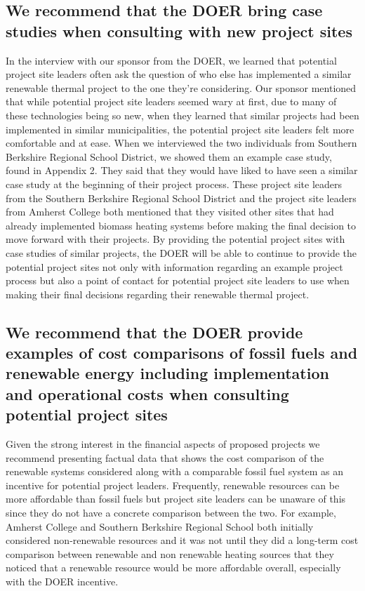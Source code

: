 \subsection{We recommend that the DOER bring case studies when consulting with new project sites}
\par In the interview with our sponsor from the DOER, we learned that potential project site leaders often ask the question of who else has implemented a similar renewable thermal project to the one they're considering. Our sponsor mentioned that while potential project site leaders seemed wary at first, due to many of these technologies being so new, when they learned that similar projects had been implemented in similar municipalities, the potential project site leaders felt more comfortable and at ease. When we interviewed the two individuals from Southern Berkshire Regional School District, we showed them an example case study, found in Appendix 2. They said that they would have liked to have seen a similar case study at the beginning of their project process. These project site leaders from the Southern Berkshire Regional School District and the project site leaders from Amherst College both mentioned that they visited other sites that had already implemented biomass heating systems before making the final decision to move forward with their projects. By providing the potential project sites with case studies of similar projects, the DOER will be able to continue to provide the potential project sites not only with information regarding an example project process but also a point of contact for potential project site leaders to use when making their final decisions regarding their renewable thermal project.

\subsection{We recommend that the DOER provide examples of cost comparisons of fossil fuels and renewable energy including implementation and operational costs when consulting potential project sites}
\par Given the strong interest in the financial aspects of proposed projects we recommend presenting factual data that shows the cost comparison of the renewable systems considered along with a comparable fossil fuel system as an incentive for potential project leaders. Frequently, renewable resources can be more affordable than fossil fuels but project site leaders can be unaware of this since they do not have a concrete comparison between the two. For example, Amherst College and Southern Berkshire Regional School both initially considered non-renewable resources and it was not until they did a long-term cost comparison between renewable and non renewable heating sources that they noticed that a renewable resource would be more affordable overall, especially with the DOER incentive. 


